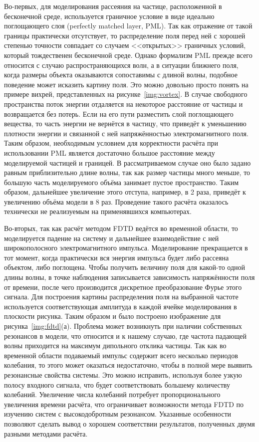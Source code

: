 Во-первых, для моделирования рассеяния на частице, расположенной в
бесконечной среде, используется граничное условие в виде идеально
поглощающего слоя (perfectly matched layer, PML). Так как отражение от
такой границы практически отсутствует, то распределение поля перед ней
с хорошей степенью точности совпадает со случаем
<<открытых>> граничных условий, который тождественен бесконечной среде.
Однако формализм PML прежде всего относится с случаю
распространяющихся волн, а в ситуации ближнего поля, когда размеры
объекта оказываются сопоставимы с длиной волны, подобное поведение
может исказить картину поля. Это можно довольно просто понять на
примере вихрей, представленных на рисунке~\ref{img:vortex}.  В
случае свободного пространства поток энергии отдаляется на некоторое
расстояние от частицы и возвращается без потерь. Если на его пути
разместить слой поглощающего вещества, то часть энергии не вернётся в
частицу, что приведёт к уменьшению плотности энергии и связанной с ней
напряжённостью электромагнитного поля.  Таким образом,
необходимым условием для корректности расчёта при использовании
 PML является достаточно большое расстояние между
моделируемой частицей и границей. В рассматриваемом случае оно было
задано равным приблизительно длине волны, так как размер частицы много
меньше, то большую часть моделируемого объёма занимает пустое
пространство. Таким образом, дальнейшее увеличение этого отступа,
например, в 2 раза, приведёт к увеличению объёма модели в 8
раз. Проведение такого расчёта оказалось технически не реализуемым на
применявшихся компьютерах.

Во-вторых, так как расчёт методом FDTD ведётся во временной области,
то моделируется падение на систему и дальнейшее взаимодействие с ней
широкополосного электромагнитного импульса.  Моделирование
прекращается в тот момент, когда практически вся энергия импульса
будет либо рассеяна объектом, либо поглощена.  Чтобы получить величину
поля для какой-то одной длины волны, в точке наблюдения записывается
зависимость напряжённости поля от времени, после чего производится
дискретное преобразование Фурье этого сигнала. Для построения
картины распределения поля на выбранной частоте используется
соответствующая амплитуда в каждой ячейке моделирования в
плоскости рисунка. Таким образом и было построено изображение для
рисунка~\ref{img:fdtd}(а). Проблема может возникнуть при наличии
собственных резонансов в модели, что относится и к нашему случаю, где
частота падающей волны приходится на максимум дипольного отклика
частицы. Так как во временной области подаваемый импульс содержит
всего несколько периодов колебания, то этого может оказаться
недостаточно, чтобы в полной мере выявить резонансные свойства
системы.  Это можно исправить, используя более узкую полосу входного
сигнала, что будет соответствовать большему количеству колебаний.
Увеличение числа колебаний потребует пропорционального
увеличения времени расчёта, что ограничивает возможности метода FDTD
по изучению систем с высокодобротным резонансом. Указанные особенности
позволяют сделать вывод о хорошем соответствии результатов, полученных
двумя разными методами расчёта.


